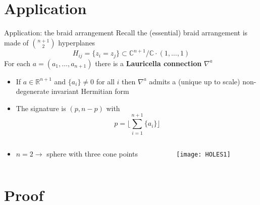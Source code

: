 \documentclass{beamer}
\newcommand{\C}{\mathbb{C}}
\newcommand{\R}{\mathbb{R}}
\begin{document}
\section{Application}

\begin{frame}{Application: the braid arrangement}
	Recall the (essential) braid arrangement is made of \(\binom{n+1}{2}\) hyperplanes 
	\[
	H_{ij}=\{z_i=z_j\} \subset  \C^{n+1} / \C \cdot (1, \ldots, 1)
	\]
	For each \(a=(a_1, \ldots, a_{n+1})\) there is a \textbf{Lauricella connection} \(\nabla^a\)
	\begin{itemize}
		\item If \(a \in \R^{n+1}\) and \(\{a_i\} \neq 0\) for all \(i\) then \(\nabla^a\) admits a (unique up to scale) non-degenerate invariant Hermitian form
		\item The signature is \((p, n-p)\) with
		\[p =  \lfloor \sum_{i=1}^{n+1} \{a_i\} \rfloor \tag{Deligne-Mostow}  \]
	\end{itemize}
	
	
	
	\begin{columns}
		\begin{column}{0.38\textwidth}
			\begin{itemize}
				\item 	\(n=2 \to\) sphere with three cone points
			\end{itemize}
			
			
		\end{column}
		\begin{column}{.48\textwidth}
			\begin{center}
				\begin{figure}
					\texttt{[image: HOLES1]}
				\end{figure}
			\end{center}
		\end{column}		
	\end{columns}
\end{frame}

\section{Proof}
\end{document}
